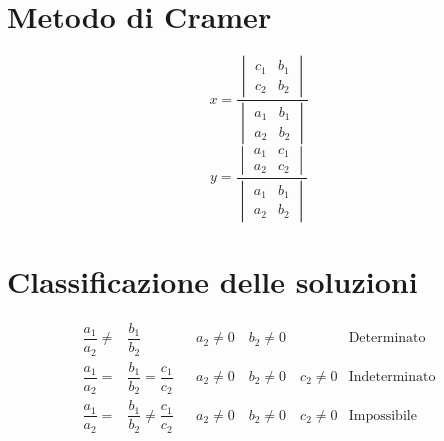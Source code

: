 \section{Metodo di Cramer}
\begin{equation}
x=\dfrac{\begin{vmatrix}
	c_{1}&b_{1}\\
	c_2&b_2
	\end{vmatrix}}{\begin{vmatrix}
	a_{1}&b_{1}\\
	a_2&b_2
	\end{vmatrix}}
\end{equation}
\begin{equation}
y=\dfrac{\begin{vmatrix}
	a_{1}&c_{1}\\
	a_2&c_2
	\end{vmatrix}}{\begin{vmatrix}
	a_{1}&b_{1}\\
	a_2&b_2
	\end{vmatrix}}
\end{equation}
\section{Classificazione delle soluzioni}
\begin{align}
\dfrac{a_1}{a_2}\neq&\dfrac{b_1}{b_2}& &a_2\neq 0\quad b_2\neq 0&\text{Determinato}\\
\dfrac{a_1}{a_2}=&\dfrac{b_1}{b_2}=\dfrac{c_1}{c_2}& &a_2\neq 0\quad b_2\neq 0\quad c_2\neq 0&\text{Indeterminato}\\
\dfrac{a_1}{a_2}=&\dfrac{b_1}{b_2}\neq\dfrac{c_1}{c_2}& &a_2\neq 0\quad b_2\neq 0\quad c_2\neq 0&\text{Impossibile}\\
\end{align}
